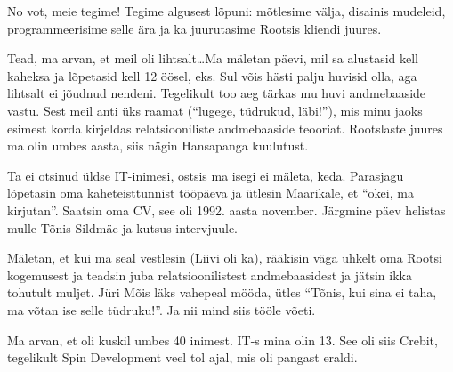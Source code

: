 
No vot, meie tegime! Tegime algusest lõpuni: mõtlesime välja, disainis 
mudeleid, programmeerisime selle ära ja ka juurutasime Rootsis kliendi juures. 


Tead, ma arvan, et meil oli lihtsalt\ldots Ma  mäletan päevi, mil sa alustasid 
kell kaheksa ja lõpetasid kell 12 öösel, eks.  Sul võis hästi palju huvisid 
olla, aga lihtsalt ei jõudnud nendeni. Tegelikult too aeg tärkas mu huvi 
andmebaaside vastu. Sest meil anti üks raamat (\enquote{lugege, tüdrukud, 
läbi!}), mis minu jaoks esimest korda kirjeldas  relatsiooniliste andmebaaside 
teooriat. Rootslaste juures ma olin umbes aasta, siis  nägin 
Hansapanga kuulutust. 


Ta ei otsinud üldse IT-inimesi, ostsis ma isegi ei mäleta, keda. Parasjagu 
lõpetasin oma kaheteisttunnist tööpäeva ja ütlesin Maarikale, et \enquote{okei, 
ma kirjutan}. Saatsin oma CV, see oli 1992. aasta november. Järgmine päev 
helistas mulle Tõnis Sildmäe ja kutsus intervjuule. 

Mäletan, et kui ma seal vestlesin (Liivi oli 
ka), rääkisin väga uhkelt oma Rootsi kogemusest ja teadsin juba 
relatsioonilistest andmebaasidest ja jätsin ikka tohutult muljet.  Jüri 
Mõis läks vahepeal mööda, ütles \enquote{Tõnis, kui sina 
ei taha, ma võtan ise selle tüdruku!}.  Ja nii mind siis tööle võeti. 

Ma arvan, et  oli kuskil umbes 40 inimest. IT-s mina olin 13. See oli siis 
Crebit, tegelikult Spin Development veel tol ajal, mis oli pangast eraldi. 


